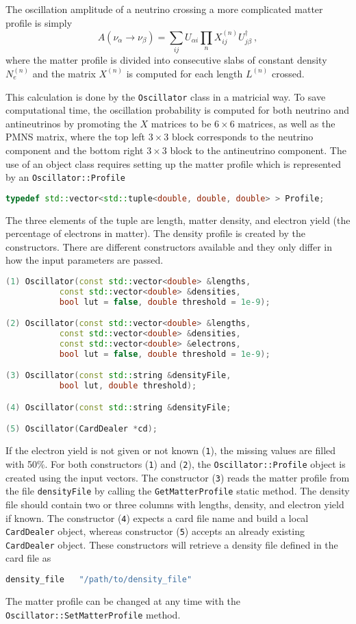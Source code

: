 \documentclass[a4paper, 11pt]{article}
\begin{document}
The oscillation amplitude of a neutrino crossing a more complicated matter profile is simply
\begin{equation}
	A(\nu_\alpha \to \nu_\beta) = \sum_{ij} U_{\alpha i} \prod_n X^{(n)}_{ij} U_{j \beta}^\dagger\ ,
\end{equation}
where the matter profile is divided into consecutive slabs of constant density $N^{(n)}_e$ and the matrix $X^(n)$ is computed for %
each length $L^{(n)}$ crossed.

This calculation is done by the \texttt{Oscillator} class in a matricial way. 
To save computational time, the oscillation probability is computed for both neutrino and antineutrinos %
by promoting the $X$ matrices to be $6\times 6$ matrices, as well as the PMNS matrix, %
where the top left $3\times 3$ block corresponds to the neutrino component and the bottom right $3\times 3$ block to the antineutrino component.
The use of an object class requires setting up the matter profile which is represented by an \texttt{Oscillator::Profile}
\begin{lstlisting}[language=C++]
    typedef std::vector<std::tuple<double, double, double> > Profile;
\end{lstlisting}
The three elements of the tuple are length, matter density, and electron yield (the percentage of electrons in matter).
The density profile is created by the constructors.
There are different constructors available and they only differ in how the input parameters are passed.
\begin{lstlisting}[language=C++]
(1) Oscillator(const std::vector<double> &lengths,
	       const std::vector<double> &densities,
	       bool lut = false, double threshold = 1e-9);

(2) Oscillator(const std::vector<double> &lengths,
	       const std::vector<double> &densities,
	       const std::vector<double> &electrons,
	       bool lut = false, double threshold = 1e-9);

(3) Oscillator(const std::string &densityFile,
	       bool lut, double threshold);

(4) Oscillator(const std::string &densityFile;

(5) Oscillator(CardDealer *cd);
\end{lstlisting}
If the electron yield is not given or not known (\texttt{1}), the missing values are filled with 50\%.
For both constructors (\texttt{1}) and (\texttt{2}), the \texttt{Oscillator::Profile} object is created using the input vectors.
The constructor (\texttt{3}) reads the matter profile from the file \texttt{densityFile} by calling the \texttt{GetMatterProfile} static method.
The density file should contain two or three columns with lengths, density, and electron yield if known.
The constructor (\texttt{4}) expects a card file name and build a local \texttt{CardDealer} object, %
whereas constructor (\texttt{5}) accepts an already existing \texttt{CardDealer} object.
These constructors will retrieve a density file defined in the card file as
\begin{lstlisting}[language=bash]
    density_file   "/path/to/density_file"
\end{lstlisting}
The matter profile can be changed at any time with the \texttt{Oscillator::SetMatterProfile} method.
\end{document}

